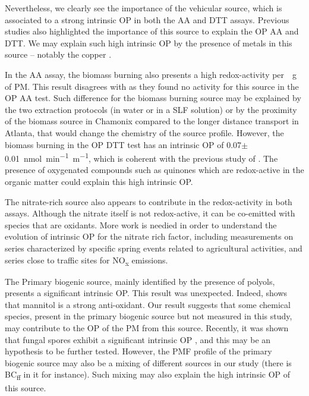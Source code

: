 \documentclass[acp, manuscript]{copernicus}
\begin{document}
Nevertheless, we clearly see the importance of the vehicular source, which is
associated to a strong intrinsic OP in both the AA and DTT assays. Previous
studies \citep{bates_reactive_2015,fang_oxidative_2016,verma_reactive_2014} also
highlighted the importance of this source to explain the OP AA and DTT. We may
explain such high intrinsic OP by the presence of metals in this source
-- notably the copper \citep{charrier_oxidant_2015}.

In the AA assay, the biomass burning also presents a high redox-activity
per~\unit{\mu g} of PM. This result disagrees with \citet{fang_oxidative_2016} as they found no
activity for this source in the OP AA test. Such difference for the biomass
burning source may be explained by the two extraction protocols (in water or in
a SLF solution) or by the proximity of the biomass source in Chamonix compared
to the longer distance transport in Atlanta, that would change the chemistry of
the source profile. However, the biomass burning in the OP DTT test has an
intrinsic OP of 0.07$\pm$0.01~\unit{nmol~min^{-1}~m^{-1}}, which is coherent
with the previous study of \citet{fang_oxidative_2016}. The presence of
oxygenated compounds such as quinones which are redox-active in the organic
matter could explain this high intrinsic OP.

The nitrate-rich source also appears to contribute in the redox-activity in both
assays. Although the nitrate itself is not redox-active, it can be co-emitted
with species that are oxidants. More work is needied in order to understand the
evolution of intrinsic OP for the nitrate rich factor, including measurements on
series characterized by specific spring events related to agricultural activities, and
series close to traffic sites for NO\textsubscript{x} emissions.

The Primary biogenic source, mainly identified by the presence of polyols,
presents a significant intrinsic OP. This result was unexpected. Indeed,
\citet{liu_therapeutic_2010} shows that mannitol is a strong anti-oxidant. Our
result suggests that some chemical species, present in the primary biogenic
source but not measured in this study, may contribute to the OP of the PM from
this source. Recently, it was shown that fungal spores exhibit a significant
intrinsic OP \citep{samake_unexpected_2017}, and this may be an hypothesis to be
further tested. However, the PMF profile of the primary biogenic source may also
be a mixing of different sources in our study (there is BC\textsubscript{ff} in
it for instance). Such mixing may also explain the high intrinsic OP of this
source.
\end{document}
